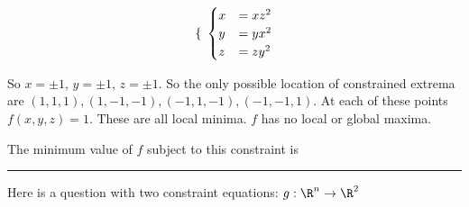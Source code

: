 \documentclass{ximera}
\begin{document}
\begin{question}
\begin{solution}
\begin{hint}
\[\begin{cases}
					  \end{cases}\\
					  \\
					  \begin{cases}
						x &=  xz^2\\
						y &=  yx^2\\
						z &=  zy^2
					  \end{cases}
					\]
			\end{hint}
			\begin{hint}
				So $x=\pm 1$, $y= \pm 1$, $z = \pm 1$.  So the only possible location of constrained extrema are $(1,1,1),(1,-1,-1),(-1,1,-1),(-1,-1,1)$.  At each of these points
				$f(x,y,z) =1$.  These are all local minima.  $f$ has no local or global maxima.
			\end{hint}
			The minimum value of $f$ subject to this constraint is 
		\end{solution}
		
	\end{question}

	\hrule

	Here is a question with two constraint equations:  $g:\R^n \to \R^2$
	
\end{document}
